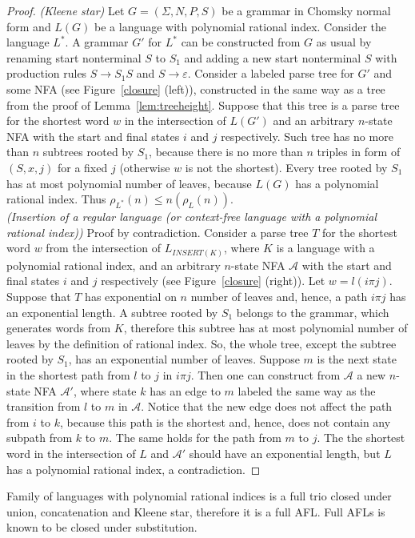 \begin{proof}
\textit{(Kleene star)} Let $G = (\Sigma, N, P, S)$ be a grammar in Chomsky normal form and $L(G)$ be a language with polynomial rational index. Consider the language $L^{*}$. A grammar $G'$ for $L^{*}$ can be constructed from $G$ as usual by renaming start nonterminal $S$ to $S_1$ and adding a new start nonterminal $S$ with production rules $S \rightarrow S_1S$ and $S \rightarrow \varepsilon$. Consider a labeled parse tree for $G'$ and some NFA (see Figure~\ref{closure} (left)), constructed in the same way as a tree from the proof of Lemma~\ref{lem:treeheight}. Suppose that this tree is a parse tree for the shortest word $w$ in the intersection of $L(G')$ and an arbitrary $n$-state NFA with the start and final states $i$ and $j$ respectively. Such tree has no more than $n$ subtrees rooted by $S_1$, because there is no more than $n$ triples in form of $(S, x, j)$ for a fixed $j$ (otherwise $w$ is not the shortest). Every tree rooted by $S_1$ has at most polynomial number of leaves, because $L(G)$ has a polynomial rational index. Thus $\rho_{L^{*}}(n) \le n(\rho_L(n))$.
\\
\textit{(Insertion of a regular language (or context-free language with a polynomial rational index))} Proof by contradiction. Consider a parse tree $T$ for the shortest word $w$ from the intersection of $L_{INSERT(K)}$, where $K$ is a language with a polynomial rational index, and an arbitrary $n$-state NFA $\mathcal{A}$ with the start and final states $i$ and $j$ respectively (see Figure~\ref{closure} (right)). Let $w = l(i \pi j)$. Suppose that $T$ has exponential on $n$ number of leaves and, hence, a path $i \pi j$ has an exponential length. A subtree rooted by $S_1$ belongs to the grammar, which generates words from $K$, therefore this subtree has at most polynomial number of leaves by the definition of rational index. So, the whole tree, except the subtree rooted by $S_1$, has an exponential number of leaves. Suppose $m$ is the next state in the shortest path from $l$ to $j$ in $i \pi j$. Then one can construct from $\mathcal{A}$ a new $n$-state NFA $\mathcal{A'}$, where state $k$ has an edge to $m$ labeled the same way as the transition from $l$ to $m$ in $\mathcal{A}$. Notice that the new edge does not affect the path from $i$ to $k$, because this path is the shortest and, hence, does not contain any subpath from $k$ to $m$. The same holds for the path from $m$ to $j$. The the shortest word in the intersection of $L$ and $\mathcal{A'}$ should have an exponential length, but $L$ has a polynomial rational index, a contradiction.
\end{proof}
Family of languages with polynomial rational indices is a full trio closed under union, concatenation and Kleene star, therefore it is a full AFL. Full AFLs is known to be closed under substitution.



